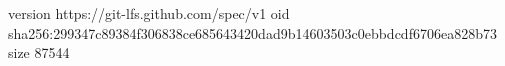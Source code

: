 version https://git-lfs.github.com/spec/v1
oid sha256:299347c89384f306838ce685643420dad9b14603503c0ebbdcdf6706ea828b73
size 87544
